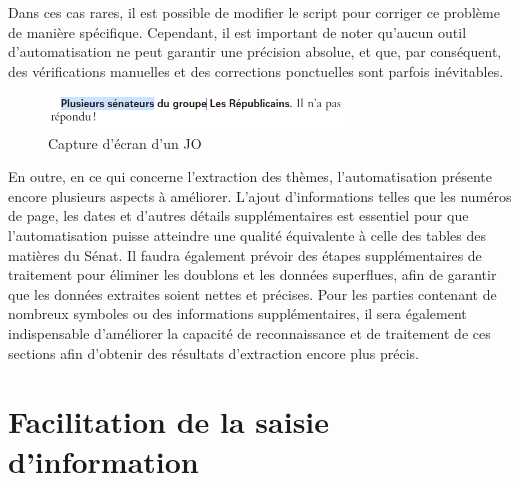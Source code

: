 Dans ces cas rares, il est possible de modifier le script pour corriger ce problème de manière spécifique. Cependant, il est important de noter qu'aucun outil d'automatisation ne peut garantir une précision absolue, et que, par conséquent, des vérifications manuelles et des corrections ponctuelles sont parfois inévitables.

\begin{figure}[H]
    \centering
    \includegraphics[width=0.7\textwidth]{images/Capture d'écran 2024-09-28 041223.png}
    \caption{Capture d'écran d'un JO}
\end{figure}

En outre, en ce qui concerne l'extraction des thèmes, l'automatisation présente encore plusieurs aspects à améliorer. L'ajout d'informations telles que les numéros de page, les dates et d'autres détails supplémentaires est essentiel pour que l'automatisation puisse atteindre une qualité équivalente à celle des tables des matières du Sénat. Il faudra également prévoir des étapes supplémentaires de traitement pour éliminer les doublons et les données superflues, afin de garantir que les données extraites soient nettes et précises. Pour les parties contenant de nombreux symboles ou des informations supplémentaires, il sera également indispensable d'améliorer la capacité de reconnaissance et de traitement de ces sections afin d'obtenir des résultats d'extraction encore plus précis.
\newpage
\section{Facilitation de la saisie d’information}


